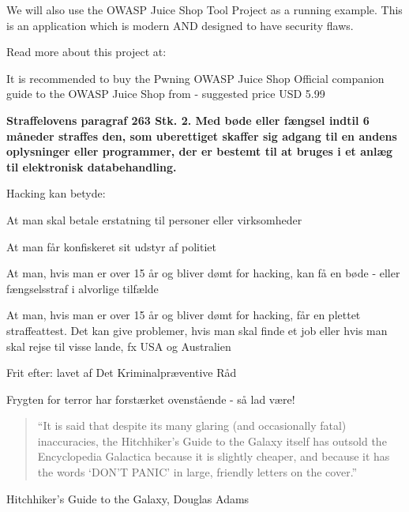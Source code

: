 \documentclass[Screen16to9,17pt]{foils}
\begin{document}


We will also use the OWASP Juice Shop Tool Project as a running example. This is an application which is modern AND designed to have security flaws.

Read more about this project at: \\ 

It is recommended to buy the Pwning OWASP Juice Shop Official companion guide to the OWASP Juice Shop from  - suggested price USD 5.99



\vskip 1cm
{\bfseries Straffelovens paragraf 263 Stk. 2. Med bøde eller fængsel
  indtil 6 måneder
straffes den, som uberettiget skaffer sig adgang til en andens
oplysninger eller programmer, der er bestemt til at bruges i et anlæg
til elektronisk databehandling.}

Hacking kan betyde:
\begin{list2}
\item At man skal betale erstatning til personer eller virksomheder
\item At man får konfiskeret sit udstyr af politiet
\item At man, hvis man er over 15 år og bliver dømt for hacking, kan
  få en bøde - eller fængselsstraf i alvorlige tilfælde
\item At man, hvis man er over 15 år og bliver dømt for hacking, får
en plettet straffeattest. Det kan give problemer, hvis man skal finde
et job eller hvis man skal rejse til visse lande, fx USA og
Australien
\item Frit efter:  lavet af Det
  Kriminalpræventive Råd
\item Frygten for terror har forstærket ovenstående - så lad være!
\end{list2}




\begin{quote}
“It is said that despite its many glaring (and occasionally fatal) inaccuracies, the Hitchhiker’s Guide to the Galaxy itself has outsold the Encyclopedia Galactica because it is slightly cheaper, and because it has the words ‘DON’T PANIC’ in large, friendly letters on the cover.”
\end{quote}
Hitchhiker’s Guide to the Galaxy, Douglas Adams
\end{document}
